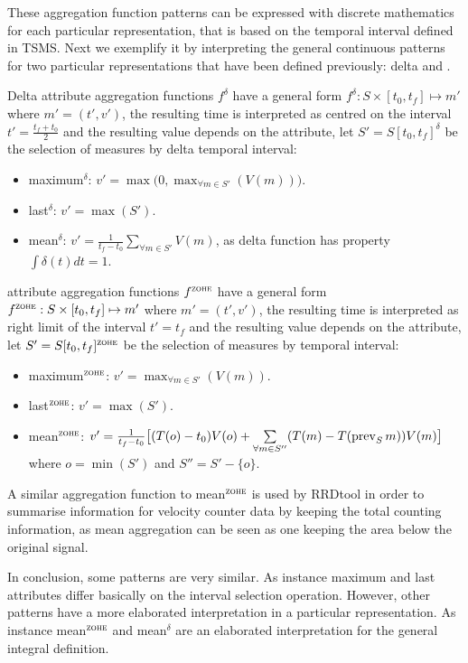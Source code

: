 These aggregation function patterns can be expressed with discrete
mathematics for each particular representation, that is based on the
temporal interval defined in TSMS. Next we exemplify it by
interpreting the general continuous patterns for two particular
representations that have been defined previously: delta and \zohe{}.


Delta attribute aggregation functions $f^\delta$ have a general form
$f^\delta : S \times [t_0,t_f]\mapsto m'$ where $m'=(t',v')$, the
resulting time is interpreted as centred on the interval
$t'=\frac{t_f+t_0}{2}$ and the resulting value depends on the
attribute, let $S'=S[t_0,t_f]^\delta$ be the selection of measures by
delta temporal interval:
\begin{itemize}
\item maximum$^\delta$: $v' = \max\big(0,\max_{\forall m \in S'}(V(m))\big)$. 
\item last$^\delta$: $v' = \max(S')$.
\item mean$^\delta$: $v' = \frac{1}{t_f-t_0} \sum\limits_{\forall m
    \in S'} V(m)$, as delta function has property $\int\delta(t)dt=1$.
\end{itemize}


\zohe{} attribute aggregation functions $f^\zohe{}$ have a general
form $f^\zohe{} : S \times [t_0,t_f]\mapsto m'$ where $m'=(t',v')$,
the resulting time is interpreted as right limit of the interval
$t'=t_f$ and the resulting value depends on the attribute, let
$S'=S[t_0,t_f]^\zohe{}$ be the selection of measures by \zohe{} temporal
interval:
\begin{itemize}
\item maximum$^\zohe{}$: $v' = \max_{\forall m \in S'}(V(m))$. 
\item last$^\zohe{}$: $v' = \max(S')$.
\item mean$^\zohe{}$: $v' = \frac{1}{t_f-t_0} \big[ (T(o)-t_0)V(o) +
  \sum\limits_{\forall m \in S''}( T(m)- T(\operatorname*{prev}_S
  m) )V(m) \big]$ where $o=\min(S')$ and $S''= S' - \{o\}$.
\end{itemize}

A similar aggregation function to mean$^\zohe{}$ is used by RRDtool
\cite{rrdtool} in order to summarise information for velocity counter
data by keeping the total counting information, as mean aggregation
can be seen as one keeping the area below the original signal.


In conclusion, some patterns are very similar. As instance maximum and
last attributes differ basically on the interval selection
operation. However, other patterns have a more elaborated
interpretation in a particular representation. As instance
mean$^\zohe{}$ and mean$^\delta$ are an elaborated interpretation for
the general integral definition.





